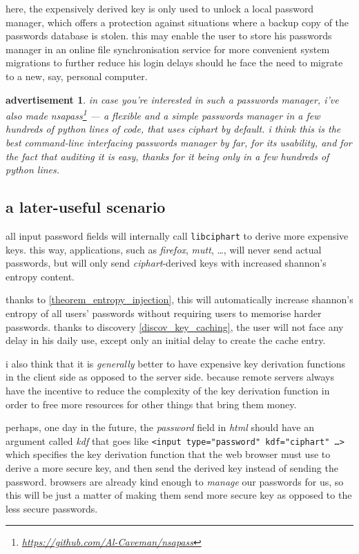 \documentclass[twocolumn]{article}
\newtheorem{advertisement}{advertisement}
\begin{document}
here, the expensively derived key is only used to unlock a local password
manager, which offers a protection against situations where a backup copy
of the passwords database is stolen.  this may enable the user to store his
passwords manager in an online file synchronisation service for more
convenient system migrations to further reduce his login delays should he
face the need to migrate to a new, say, personal computer.

\begin{advertisement}
    in case you're interested in such a passwords manager, i've also made
    \emph{nsapass}\footnote{\url{https://github.com/Al-Caveman/nsapass}}
    --- a flexible and a simple passwords manager in a few hundreds of
    python lines of code, that uses \emph{ciphart} by default.  i think
    this is the best command-line interfacing passwords manager by far, for
    its usability, and for the fact that auditing it is easy, thanks for it
    being only in a few hundreds of python lines.
\end{advertisement}

\subsection{a later-useful scenario}
all input password fields will internally call \texttt{libciphart} to
derive more expensive keys.  this way, applications, such as
\emph{firefox}, \emph{mutt}, \ldots, will never send actual passwords, but
will only send \emph{ciphart}-derived keys with increased shannon's entropy
content.

thanks to \cref{theorem_entropy_injection}, this will automatically
increase shannon's entropy of all users' passwords without requiring users
to memorise harder passwords.  thanks to discovery
\ref{discov_key_caching}, the user will not face any delay in his daily
use, except only an initial delay to create the cache entry.

i also think that it is \emph{generally} better to have expensive key
derivation functions in the client side as opposed to the server side.
because remote servers always have the incentive to reduce the complexity
of the key derivation function in order to free more resources for other
things that bring them money.

perhaps, one day in the future, the \emph{password} field in \emph{html}
should have an argument called \emph{kdf} that goes like \texttt{<input
type="password" kdf="ciphart" \ldots>} which specifies the key derivation
function that the web browser must use to derive a more secure key, and
then send the derived key instead of sending the password.  browsers are
already kind enough to \emph{manage} our passwords for us, so this will be
just a matter of making them send more secure key as opposed to the less
secure passwords.  
\end{document}
